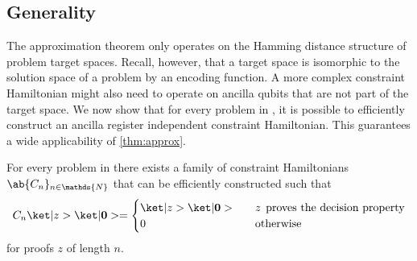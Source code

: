 \subsection{Generality}

The approximation theorem only operates on the Hamming distance structure of problem target spaces. Recall, however, that a target space is isomorphic to the solution space of a problem by an encoding function. A more complex constraint Hamiltonian might also need to operate on ancilla qubits that are not part of the target space. We now show that for every problem in \NP, it is possible to efficiently construct an ancilla register independent constraint Hamiltonian. This guarantees a wide applicability of \cref{thm:approx}.

\begin{theorem}
    \label{thm:ancilla_invariance}
    For every problem in \NP there exists a family of constraint Hamiltonians $\ab\{C_n\}_{n \in \mathds{N}}$ that can be efficiently constructed such that 
    \begin{equation}
        C_n\ket|z>\ket|\bm{0}> = \begin{cases}
            \ket|z>\ket|\bm{0}> &\quad z \:\:\text{proves the decision property} \\
            0                       &\quad \text{otherwise}
        \end{cases}
    \end{equation}
    for proofs $z$ of length $n$.
\end{theorem}

